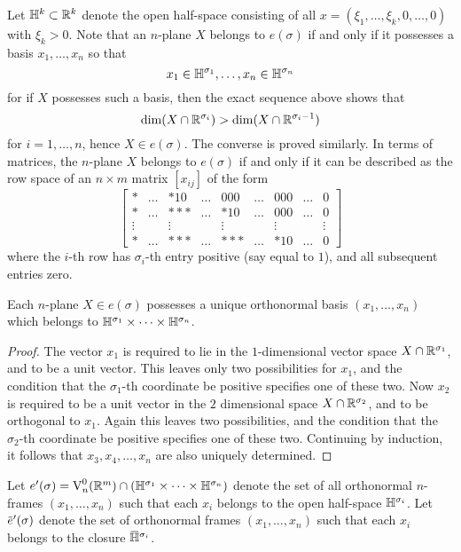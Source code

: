 \documentclass[../main]{subfiles}
\begin{document}
Let $\mathbb{H}^{k} \subset \mathbb R^{k}$ denote the open half-space consisting of all $x= (\xi_{1},\dots, \xi_{k}, 0,\dots, 0)$ with $\xi_{k}>0 $. Note that an $n$-plane $X$ belongs to $e(\sigma)$ if and only if it possesses a basis $x_{1},\dots, x_{n}$ so that
\[
x_{1} \in \mathbb{H}^{\sigma_{1}},\dots, x_{n} \in \mathbb{H}^{\sigma_{n}}
\]
for if $X$ possesses such a basis, then the exact sequence above shows that
\[
\dim(X \cap \mathbb R^{\sigma_{i}})>\dim(X \cap \mathbb R^{\sigma_{i}-1})
\]
for $i=1,\dots, n$, hence $X \in e(\sigma) $. The converse is proved similarly. In terms of matrices, the $n$-plane $X$ belongs to $e(\sigma)$ if and only if it can be described as the row space of an $n \times m$ matrix $[x_{ij}]$ of the form
\[\begin{bmatrix}
	* & \dots & *10 & \dots & 000 & \dots & 000 & \dots & 0 \\
	* & \dots & *** & \dots & *10 & \dots & 000 & \dots & 0 \\
	\vdots &  & \vdots &  & \vdots &  & \vdots &  & \vdots \\
	* & \dots & *** & \dots & *** & \dots & *10 & \dots & 0
\end{bmatrix}\]
where the $i$-th row has $\sigma_{i}$-th entry positive (say equal to $1$), and all subsequent entries zero.
\setcounter{theorem}{1}
\begin{lemma}
\label{lem:06.02}
Each $n$-plane $X \in e(\sigma)$ possesses a unique orthonormal basis $(x_{1},\dots, x_{n})$ which belongs to $\mathbb{H}^{\sigma_{1}} \times\dots \times \mathbb{H}^{\sigma_{n}}$.
\end{lemma}
\begin{proof}
The vector $x_{1}$ is required to lie in the $1$-dimensional vector space $X \cap \mathbb R^{\sigma_{1}}$, and to be a unit vector. This leaves only two possibilities for $x_{1}$, and the condition that the $\sigma_{1}$-th coordinate be positive specifies one of these two. Now $x_{2}$ is required to be a unit vector in the $2$ dimensional space $X\cap\mathbb R^{\sigma_{2}}$, and to be orthogonal to $x_{1} $. Again this leaves two possibilities, and the condition that the $\sigma_{2}$-th coordinate be positive specifies one of these two. Continuing by induction, it follows that $x_{3}, x_{4},\dots, x_{n}$ are also uniquely determined.
\end{proof}

\begin{definition}
\label{def:06.02}
Let $e^{\prime}(\sigma)=\operatorname{V}_{n}^{0}(\mathbb R^m) \cap(\mathbb{H}^{\sigma_{1}} \times\dots \times \mathbb{H}^{\sigma_{n}})$ denote the set of all orthonormal $n$-frames $(x_{1},\dots, x_{n})$ such that each $x_{i}$ belongs to the open half-space $\mathbb{H}^{\sigma_i}$. Let $\xoverline{e}^{\prime}(\sigma)$ denote the set of orthonormal frames $(x_{1},\dots, x_{n})$ such that each $x_{i}$ belongs to the closure $\xoverline{\halfspace}^{\sigma_{i}}$.
\end{definition}
\end{document}
